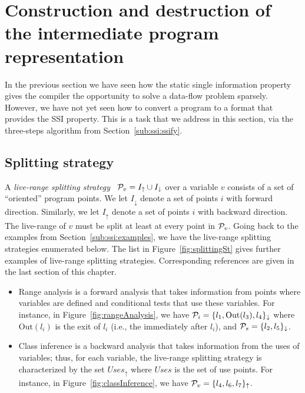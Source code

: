 {\section{Construction and destruction of the intermediate program representation}
\label{sec:building}
\def\Sdown{\downarrow}
\def\Sup{\uparrow}
\def\SS{{\cal P}}
\def\Out{\textrm{Out}}
\def\In{\textrm{In}}
\def\Defs{\textrm{Defs}}
\def\Def{\textrm{Def}}
\def\Uses{\textrm{Uses}}

In the previous section we have seen how the static single information
property gives the compiler the opportunity to solve a data-flow problem sparsely.
However, we have not yet seen how to convert a program to a format that provides the SSI property.
This is a task that we address in this section, via the three-steps algorithm from Section~\ref{sub:ssi:ssify}.

\subsection{Splitting strategy}
A {\em live-range splitting strategy} \
$\SS_v = I_\uparrow \cup I_\downarrow$ over a variable $v$ consists of a set
of ``oriented'' program points.
We let $I_\downarrow$ denote a set of points $i$ with forward direction.
Similarly, we let $I_\uparrow$ denote a set of points $i$ with backward
direction.
The live-range of $v$ must be split at least at every point in $\SS_v$.
Going back to the examples from Section~\ref{sub:ssi:examples}, we have the live-range splitting strategies enumerated below.
The list in Figure~\ref{fig:splittingSt} gives further examples of live-range splitting strategies. Corresponding references are given in the last section of this chapter.

\begin{itemize}
  \item Range analysis is a forward 
    analysis that takes information from points where variables are defined and 
    conditional tests that use these variables.
For instance, in Figure~\ref{fig:rangeAnalysis}, we have $\SS_{i} = \{l_1, 
\Out(l_3), l_4\}_\downarrow$ where $\Out(l_i)$ is the exit of $l_i$ (i.e., the 
\progpoint immediately after $l_i$), and $\SS_{s}=\{l_2, l_5\}_\downarrow$.

\item Class inference is a backward analysis that takes 
  information from the uses of variables; thus, for each variable, the 
  live-range splitting strategy is characterized by the set 
  $\textit{Uses}_\uparrow$ where $\textit{Uses}$ is the set of use points.
For instance, in Figure~\ref{fig:classInference}, we have $\SS_{v} = \{l_4, 
l_6,l_7\}_\uparrow$.



\end{itemize}}
